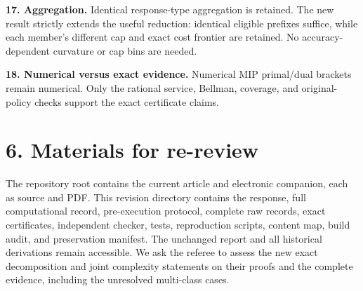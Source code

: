 \documentclass[11pt,letterpaper]{article}
\begin{document}
\textbf{17. Aggregation.} Identical response-type aggregation is retained. The new result strictly extends the useful reduction: identical eligible prefixes suffice, while each member's different cap and exact cost frontier are retained. No accuracy-dependent curvature or cap bins are needed.



\textbf{18. Numerical versus exact evidence.} Numerical MIP primal/dual brackets remain numerical. Only the rational service, Bellman, coverage, and original-policy checks support the exact certificate claims.



\section*{6. Materials for re-review}


The repository root contains the current article and electronic companion, each as source and PDF. This revision directory contains the response, full computational record, pre-execution protocol, complete raw records, exact certificates, independent checker, tests, reproduction scripts, content map, build audit, and preservation manifest. The unchanged report and all historical derivations remain accessible. We ask the referee to assess the new exact decomposition and joint complexity statements on their proofs and the complete evidence, including the unresolved multi-class cases.
\end{document}
